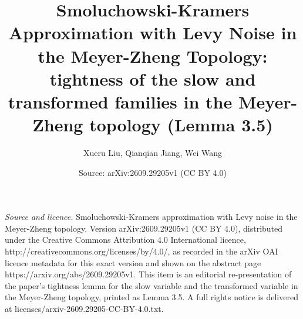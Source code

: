 \documentclass[10pt,a4paper]{amsart}
\title[Smoluchowski-Kramers approximation with Levy noise]{Smoluchowski-Kramers Approximation with Levy Noise in the Meyer-Zheng Topology: tightness of the slow and transformed families in the Meyer-Zheng topology (Lemma 3.5)}
\author[X. Liu, Q. Jiang, W. Wang]{Xueru Liu, Qianqian Jiang, Wei Wang}
\date{Source: arXiv:2609.29205v1 (CC BY 4.0)}
\theoremstyle{plain}
\numberwithin{equation}{section}
\begin{document}
\maketitle
\vspace{1em}
\noindent\textit{Source and licence.} Smoluchowski-Kramers approximation with Levy noise in the Meyer-Zheng topology. Version arXiv:2609.29205v1 (CC BY 4.0), distributed under the Creative Commons Attribution 4.0 International licence, http://creativecommons.org/licenses/by/4.0/, as recorded in the arXiv OAI licence metadata for this exact version and shown on the abstract page https://arxiv.org/abs/2609.29205v1. This item is an editorial re-presentation of the paper's tightness lemma for the slow variable and the transformed variable in the Meyer-Zheng topology, printed as Lemma 3.5. A full rights notice is delivered at licenses/arxiv-2609.29205-CC-BY-4.0.txt.
\end{document}
